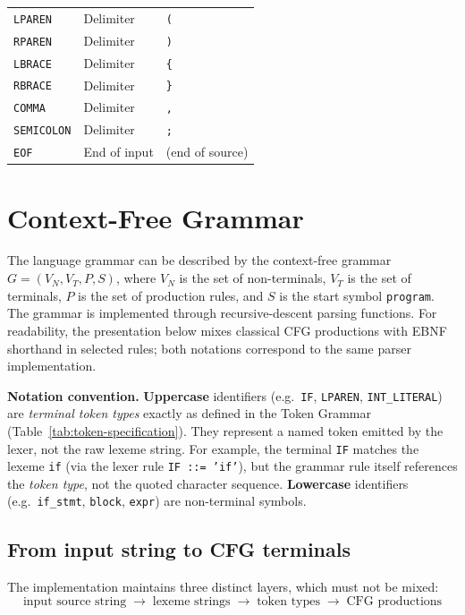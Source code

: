 \begin{table}[H]
\begin{tabular}{lll}
\midrule
\texttt{LPAREN}         & Delimiter         & \texttt{(} \\
\texttt{RPAREN}         & Delimiter         & \texttt{)} \\
\texttt{LBRACE}         & Delimiter         & \texttt{\{} \\
\texttt{RBRACE}         & Delimiter         & \texttt{\}} \\
\texttt{COMMA}          & Delimiter         & \texttt{,} \\
\texttt{SEMICOLON}      & Delimiter         & \texttt{;} \\
\texttt{EOF}            & End of input      & (end of source) \\
\bottomrule
\end{tabular}
\end{table}

\section{Context-Free Grammar}
The language grammar can be described by the context-free grammar
$G = (V_N, V_T, P, S)$, where $V_N$ is the set of non-terminals, $V_T$ is the
set of terminals, $P$ is the set of production rules, and $S$ is the start
symbol \texttt{program}. The grammar is implemented through recursive-descent
parsing functions.
For readability, the presentation below mixes classical CFG productions with
EBNF shorthand in selected rules; both notations correspond to the same parser
implementation.

\noindent\textbf{Notation convention.}
\textbf{Uppercase} identifiers (e.g.\ \texttt{IF}, \texttt{LPAREN},
\texttt{INT\_LITERAL}) are \emph{terminal token types} exactly as defined in the
Token Grammar (Table~\ref{tab:token-specification}).  They represent a named
token emitted by the lexer, not the raw lexeme string.  For example, the
terminal \texttt{IF} matches the lexeme \texttt{if} (via the
lexer rule \texttt{IF ::= 'if'}), but the grammar rule itself references the
\emph{token type}, not the quoted character sequence.
\textbf{Lowercase} identifiers (e.g.\ \texttt{if\_stmt}, \texttt{block},
\texttt{expr}) are non-terminal symbols.

\subsection{From input string to CFG terminals}
\label{sec:input-to-cfg}
The implementation maintains three distinct layers, which must not be mixed:
\[
\text{input source string} \;\rightarrow\; \text{lexeme strings}
\;\rightarrow\; \text{token types} \;\rightarrow\; \text{CFG productions}
\]

